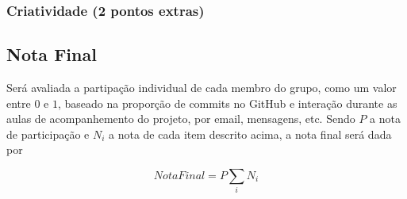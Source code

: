 \documentclass[11pt]{article}
\begin{document}
\subsubsection{Criatividade (2 pontos extras)}
\label{sec:orgf394c98}
\subsection{Nota Final}
\label{sec:org55450da}

Será avaliada a partipação individual de cada membro do grupo, como um
valor entre \(0\) e \(1\), baseado na proporção de commits no GitHub e
interação durante as aulas de acompanhemento do projeto, por email,
mensagens, etc. Sendo \(P\) a nota de participação e \(N_i\) a nota de cada
item descrito acima, a nota final será dada por

\[\mathit{NotaFinal} = P \sum_i N_i\]
\end{document}
